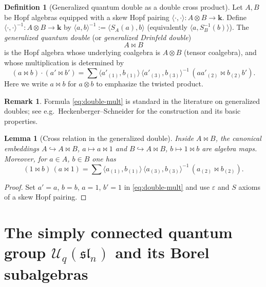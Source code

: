 \documentclass[11pt]{article}
\newtheorem{lemma}{Lemma}
\theoremstyle{definition}
\newtheorem{definition}{Definition}
\newtheorem{remark}{Remark}
\newcommand{\Bbbk}{\mathbf{k}}
\newcommand{\Uc}{\mathcal{U}}
\newcommand{\fsl}{\mathfrak{sl}}
\newcommand{\eps}{\varepsilon}
\newcommand{\bipr}{\bowtie}
\newcommand{\tensor}{\otimes}
\newcommand{\la}{\langle}
\newcommand{\ra}{\rangle}
\begin{document}
\begin{definition}[Generalized quantum double as a double cross product]
Let $A,B$ be Hopf algebras equipped with a skew Hopf pairing $\la\cdot,\cdot\ra:A\tensor B\to \Bbbk$.
Define $\la\cdot,\cdot\ra^{-1}:A\tensor B\to \Bbbk$ by $\la a,b\ra^{-1}:=\la S_A(a),b\ra$ (equivalently $\la a,S_B^{-1}(b)\ra$).
The \emph{generalized quantum double} (or \emph{generalized Drinfeld double})
\[
A \bipr B
\]
is the Hopf algebra whose underlying coalgebra is $A\tensor B$ (tensor coalgebra), and whose multiplication is determined by
\begin{equation}\label{eq:double-mult}
(a\bipr b)\cdot (a'\bipr b')
=\sum 
\la a'_{(1)}, b_{(1)}\ra\,
\la a'_{(3)}, b_{(3)}\ra^{-1}\,
(aa'_{(2)}\bipr b_{(2)}b').
\end{equation}
Here we write $a\bipr b$ for $a\tensor b$ to emphasize the twisted product.
\end{definition}

\begin{remark}
Formula \eqref{eq:double-mult} is standard in the literature on generalized doubles; see e.g.\ Heckenberger--Schneider for the construction and its basic properties.  %
\end{remark}

\begin{lemma}[Cross relation in the generalized double]\label{lem:cross-relation}
Inside $A\bipr B$, the canonical embeddings $A\hookrightarrow A\bipr B$, $a\mapsto a\bipr 1$ and $B\hookrightarrow A\bipr B$, $b\mapsto 1\bipr b$ are algebra maps. Moreover, for $a\in A$, $b\in B$ one has
\begin{equation}\label{eq:cross}
(1\bipr b)\,(a\bipr 1)
=
\sum 
\la a_{(1)}, b_{(1)}\ra\,
\la a_{(3)}, b_{(3)}\ra^{-1}\,
(a_{(2)}\bipr b_{(2)}).
\end{equation}
\end{lemma}

\begin{proof}
Set $a'=a$, $b=b$, $a=1$, $b'=1$ in \eqref{eq:double-mult} and use $\eps$ and $S$ axioms of a skew Hopf pairing.
\end{proof}


\section{The simply connected quantum group $\Uc_q(\fsl_n)$ and its Borel subalgebras}
\end{document}
